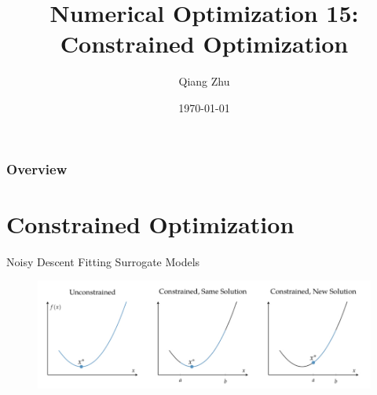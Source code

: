 \documentclass{beamer}
\title[Constrained Optimization]{Numerical Optimization 15: Constrained Optimization} %
\author{Qiang Zhu} %
\institute[University of Nevada Las Vegas] %
{
University of Nevada Las Vegas\\ %
\medskip
}
\date{\today} %
\begin{document}
\begin{frame}
\titlepage %
\end{frame}

\begin{frame}
\frametitle{Overview} %
\tableofcontents %
\end{frame}



\section{Constrained Optimization}
\begin{frame}{Noisy Descent}
Fitting Surrogate Models
\begin{figure}
\centering
\includegraphics[width=120mm]{Figs/constraint-ab.jpeg}
\end{figure}   

\end{frame}
\end{document}
